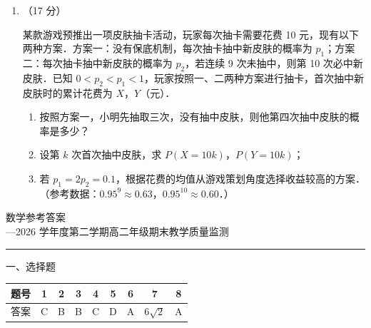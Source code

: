 \documentclass[a4paper,12pt]{ctexart}
\begin{document}
\begin{enumerate}[leftmargin=2em,itemsep=6pt,resume]
\item （17 分）

某款游戏预推出一项皮肤抽卡活动，玩家每次抽卡需要花费 10 元，现有以下两种方案．方案一：没有保底机制，每次抽卡抽中新皮肤的概率为 $p_{1}$；方案二：每次抽卡抽中新皮肤的概率为 $p_{2}$，若连续 9 次未抽中，则第 10 次必中新皮肤．已知 $0 < p_{2} < p_{1} < 1$，玩家按照一、二两种方案进行抽卡，首次抽中新皮肤时的累计花费为 $X$，$Y$（元）．

\begin{enumerate}[label=(\arabic*),leftmargin=3em,itemsep=3pt]
  \item 按照方案一，小明先抽取三次，没有抽中皮肤，则他第四次抽中皮肤的概率是多少？
  \item 设第 $k$ 次首次抽中皮肤，求 $P(X = 10k)$，$P(Y = 10k)$；
  \item 若 $p_{1} = 2p_{2} = 0.1$，根据花费的均值从游戏策划角度选择收益较高的方案．（参考数据：$0.95^{9} \approx 0.63$，$0.95^{10} \approx 0.60$．）
\end{enumerate}

\end{enumerate}


\newpage
\thispagestyle{answerstyle}
\pagestyle{answerstyle}

\begin{center}
\vspace*{0.5cm}
{\heiti 数学参考答案}\\[0.3em]
{---2026 学年度第二学期高二年级期末教学质量监测}
\end{center}

\vspace{0.3cm}
{\small\noindent\rule{\textwidth}{0.4pt}}
\vspace{0.5cm}

{\heiti 一、选择题}

\vspace{0.3cm}
\begin{center}
\begin{tabular}{c|cccccccc}
\toprule
题号 & 1 & 2 & 3 & 4 & 5 & 6 & 7 & 8 \\
\midrule
答案 & C & B & B & C & D & A & $6\sqrt{2}$\footnotemark & A \\
\bottomrule
\end{tabular}
\end{center}
\end{document}
